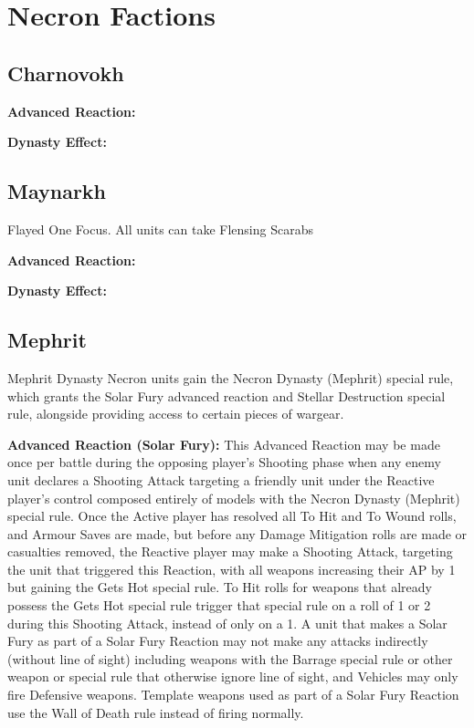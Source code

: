 \section{Necron Factions}

\subsection{Charnovokh}

\textbf{Advanced Reaction:}

\textbf{Dynasty Effect:}


\subsection{Maynarkh}

Flayed One Focus. All units can take Flensing Scarabs

\textbf{Advanced Reaction:}

\textbf{Dynasty Effect:}


\subsection{Mephrit}

Mephrit Dynasty Necron units gain the Necron Dynasty (Mephrit) special rule, which grants the Solar Fury advanced reaction and Stellar Destruction special rule, alongside providing access to certain pieces of wargear.

\textbf{Advanced Reaction (Solar Fury):} This Advanced Reaction may be made once per battle during the opposing player’s Shooting phase when any enemy unit declares a Shooting Attack targeting a friendly unit under the Reactive player’s control composed entirely of models with the Necron Dynasty (Mephrit) special rule. Once the Active player has resolved all To Hit and To Wound rolls, and Armour Saves are made, but before any Damage Mitigation rolls are made or casualties removed, the Reactive player may make a Shooting Attack, targeting the unit that triggered this Reaction, with all weapons increasing their AP by 1 but gaining the Gets Hot special rule. To Hit rolls for weapons that already possess the Gets Hot special rule trigger that special rule on a roll of 1 or 2 during this Shooting Attack, instead of only on a 1. A unit that makes a Solar Fury as part of a Solar Fury Reaction may not make any attacks indirectly (without line of sight) including weapons with the Barrage special rule or other weapon or special rule that otherwise ignore line of sight, and Vehicles may only fire Defensive weapons. Template weapons used as part of a Solar Fury Reaction use the Wall of Death rule instead of firing normally.


